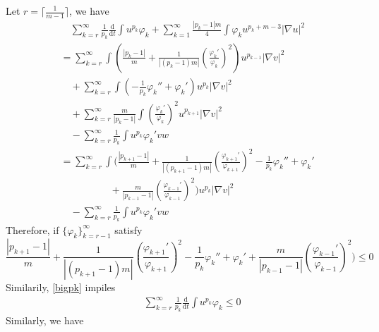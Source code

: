 \documentclass[12pt,]{article}
\begin{document}
Let $r=\lceil\frac{1}{m-1}\rceil$, we have
\begin{equation}
  \begin{aligned}
    &\quad\sum_{k=r}^{\infty}\frac{1}{p_k}\frac{\mathrm{d}}{\mathrm{d}t}\int u^{p_k}\varphi_k + \sum_{k=1}^{\infty}\frac{|p_k-1|m}{4}\int \varphi_ku^{p_k+m-3}|\nabla u|^2\\
    &= \sum_{k=r}^{\infty}\int \left(\frac{|p_k-1|}{m}+\frac{1}{|(p_k-1)m|}\left(\frac{\varphi_k'}{\varphi_k}\right)^{2}\right)u^{p_{k-1}}|\nabla v|^{2}\\
    &\quad + \sum_{k=r}^{\infty}\int \left(-\frac{1}{p_k}\varphi_k''+\varphi_{k}'\right)u^{p_{k}}|\nabla v|^2\\
    &\quad + \sum_{k=r}^{\infty}\frac{m}{|p_k-1|}\int\left(\frac{\varphi_k'}{\varphi_{k}}\right)^2u^{p_{k+1}}|\nabla v|^2\\
    &\quad - \sum_{k=r}^{\infty}\frac{1}{p_k}\int u^{p_k}\varphi_k'vw\\
    & = \sum_{k=r}^\infty\int\bigg(\frac{|p_{k+1}-1|}{m}+\frac{1}{|(p_{k+1}-1)m|}\left(\frac{\varphi_{k+1}'}{\varphi_{k+1}}\right)^{2}-\frac{1}{p_k}\varphi_k'' + \varphi_k' \\
    &\qquad\qquad\quad+\frac{m}{|p_{k-1}-1|}\left(\frac{\varphi_{k-1}'}{\varphi_{k-1}}\right)^{2}\bigg)u^{p_k}|\nabla v|^{2}\\
    & \quad - \sum_{k=r}^{\infty}\frac{1}{p_k}\int u^{p_k}\varphi_k'vw
  \end{aligned}
\end{equation}
Therefore, if $\{\varphi_k\}_{k=r-1}^{\infty}$ satisfy
\begin{equation}
\frac{|p_{k+1}-1|}{m}+\frac{1}{|(p_{k+1}-1)m|}\left(\frac{\varphi_{k+1}'}{\varphi_{k+1}}\right)^{2}-\frac{1}{p_k}\varphi_k'' + \varphi_k' +\frac{m}{|p_{k-1}-1|}\left(\frac{\varphi_{k-1}'}{\varphi_{k-1}}\right)^{2}\bigg) \leqslant0
\end{equation}
Similarily, \eqref{bigpk} 
impiles
\begin{equation}
  \begin{aligned}
    &\quad\sum_{k=r}^{\infty}\frac{1}{p_k}\frac{\mathrm{d}}{\mathrm{d}t}\int u^{p_k}\varphi_k\leqslant 0
  \end{aligned}
\end{equation}
Similarly, we have
\end{document}
